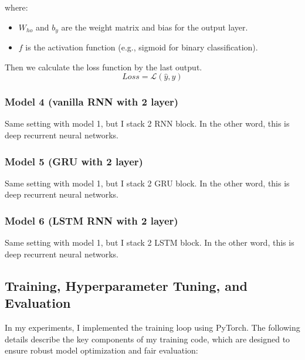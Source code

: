 \documentclass[12pt,a4paper]{article}
\begin{document}
where:
\begin{itemize}
    \item $W_{ho}$ and $b_y$ are the weight matrix and bias for the output layer.
    \item $f$ is the activation function (e.g., sigmoid for binary classification).
\end{itemize}

Then we calculate the loss function by the last output.
\begin{equation}
    Loss = \mathcal{L}(\hat{y}, y)
\end{equation}

\subsubsection{Model 4 (vanilla RNN with 2 layer)}
Same setting with model 1, but I stack 2 RNN block. In the other word, this is deep recurrent neural networks. 
\subsubsection{Model 5 (GRU with 2 layer)}
Same setting with model 1, but I stack 2 GRU block. In the other word, this is deep recurrent neural networks. 
\subsubsection{Model 6 (LSTM RNN with 2 layer)}
Same setting with model 1, but I stack 2 LSTM block. In the other word, this is deep recurrent neural networks. 

\newpage
\subsection{Training, Hyperparameter Tuning, and Evaluation}
In my experiments, I implemented the training loop using PyTorch. The following details describe the key components of my training code, which are designed to ensure robust model optimization and fair evaluation:
    
\end{document}
